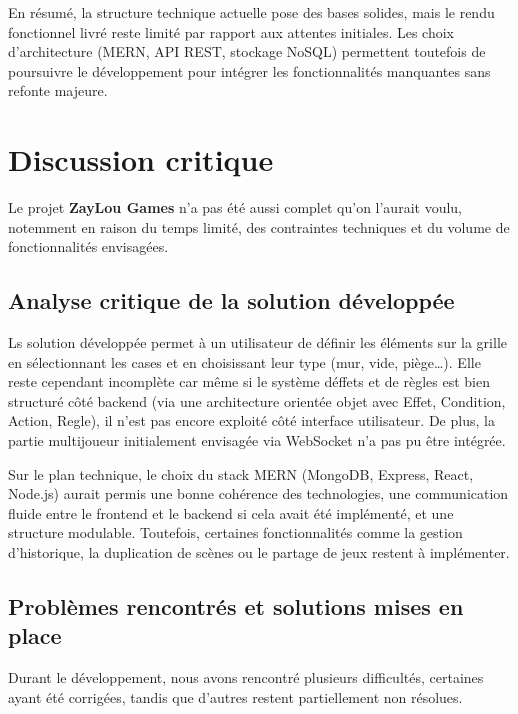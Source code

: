 \documentclass[12pt]{article}        %
\begin{document}
\noindent En résumé, la structure technique actuelle pose des bases solides, mais le rendu fonctionnel livré reste limité par rapport aux 
attentes initiales. Les choix d’architecture (MERN, API REST, stockage NoSQL) permettent toutefois de poursuivre le développement pour intégrer les fonctionnalités manquantes sans refonte majeure.


\section{Discussion critique}
\label{sec:critique}
Le projet \textbf{ZayLou Games} n'a pas été aussi complet 
qu'on l'aurait voulu, notemment en raison du temps limité, des
contraintes techniques et du volume de fonctionnalités envisagées.

\subsection{Analyse critique de la solution développée}
\label{subsec:analyse critique}
Ls solution développée permet à un utilisateur de définir les 
éléments sur la grille en sélectionnant les cases et en choisissant
leur type  (mur, vide, piège…). Elle reste cependant incomplète car 
même si le système déffets et de règles est bien structuré côté backend
(via une architecture orientée objet avec Effet, Condition, Action, 
Regle), il n'est pas encore exploité côté interface utilisateur.
De plus, la partie multijoueur initialement envisagée via WebSocket
n'a pas pu être intégrée.

Sur le plan technique, le choix du stack MERN (MongoDB, Express, React, 
Node.js) aurait permis une bonne cohérence des technologies, une 
communication  fluide entre le frontend et le backend si cela avait été 
implémenté, et une structure modulable. Toutefois, certaines 
fonctionnalités comme la gestion d’historique, la duplication de scènes 
ou le partage de jeux restent à implémenter.

\subsection{Problèmes rencontrés et solutions mises en place}
\label{subsec:prblèmes et solutions}
Durant le développement, nous avons rencontré plusieurs difficultés, certaines ayant été corrigées, tandis que d’autres restent partiellement non résolues.
\end{document}
